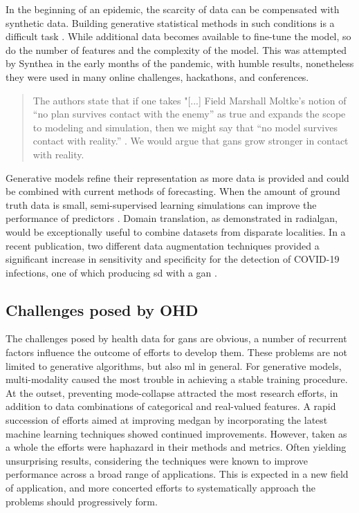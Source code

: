 In the beginning of an epidemic, the scarcity of data can be compensated with synthetic data. Building generative statistical methods in such conditions is a difficult task \cite{Latif2020-ol}. While additional data becomes available to fine-tune the model, so do the number of features and the complexity of the model. This was attempted by Synthea \cite{Walonoski_2017} in the early months of the pandemic, with humble results, nonetheless they were used in many online challenges, hackathons, and conferences. 
\begin{quote}
    The authors state that if one takes "[...] Field Marshall Moltke’s notion of “no plan survives contact with the enemy” as true and expands the scope to modeling and simulation, then we might say that “no model survives contact with reality.” \cite{walonoski_synthea_2020}. We would argue that \glspl{gan} grow stronger in contact with reality. 
\end{quote}
Generative models refine their representation as more data is provided and could be combined with current methods of forecasting. When the amount of ground truth data is small, semi-supervised learning simulations can improve the performance of predictors \cite{dahmen_synsys_2019}. Domain translation, as demonstrated in \gls{radialgan}, would be exceptionally useful to combine datasets from disparate localities. In a recent publication, two different data augmentation techniques provided a significant increase in sensitivity and specificity for the detection of COVID-19 infections, one of which producing \gls{sd} with a \gls{gan} \cite{Sedik2020-tx}.

\subsection{Challenges posed by OHD}

The challenges posed by health data for \glspl{gan} are obvious, a number of recurrent factors influence the outcome of efforts to develop them. These problems are not limited to generative algorithms, but also \gls{ml} in general. For generative models, multi-modality caused the most trouble in achieving a stable training procedure. At the outset, preventing \gls{mode-collapse} attracted the most research efforts, in addition to data combinations of categorical and real-valued features. A rapid succession of efforts aimed at improving \gls{medgan} by incorporating the latest machine learning techniques showed continued improvements. However, taken as a whole the efforts were haphazard in their methods and metrics. Often yielding unsurprising results, considering the techniques were known to improve performance across a broad range of applications. This is expected in a new field of application, and more concerted efforts to systematically approach the problems should progressively form.\par

